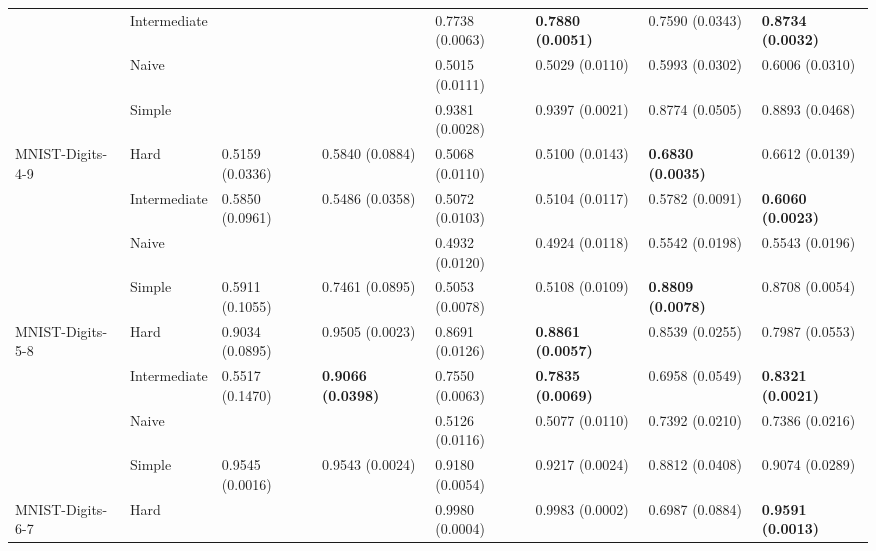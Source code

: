 \begin{tabular}{llllllll}
                 & Intermediate &                  &                           &           0.7738 (0.0063) &  \textbf{0.7880 (0.0051)} &           0.7590 (0.0343) &  \textbf{0.8734 (0.0032)} \\
                 & Naive &                  &                           &           0.5015 (0.0111) &           0.5029 (0.0110) &           0.5993 (0.0302) &           0.6006 (0.0310) \\
                 & Simple &                  &                           &           0.9381 (0.0028) &           0.9397 (0.0021) &           0.8774 (0.0505) &           0.8893 (0.0468) \\
MNIST-Digits-4-9 & Hard &  0.5159 (0.0336) &           0.5840 (0.0884) &           0.5068 (0.0110) &           0.5100 (0.0143) &  \textbf{0.6830 (0.0035)} &           0.6612 (0.0139) \\
                 & Intermediate &  0.5850 (0.0961) &           0.5486 (0.0358) &           0.5072 (0.0103) &           0.5104 (0.0117) &           0.5782 (0.0091) &  \textbf{0.6060 (0.0023)} \\
                 & Naive &                  &                           &           0.4932 (0.0120) &           0.4924 (0.0118) &           0.5542 (0.0198) &           0.5543 (0.0196) \\
                 & Simple &  0.5911 (0.1055) &           0.7461 (0.0895) &           0.5053 (0.0078) &           0.5108 (0.0109) &  \textbf{0.8809 (0.0078)} &           0.8708 (0.0054) \\
MNIST-Digits-5-8 & Hard &  0.9034 (0.0895) &           0.9505 (0.0023) &           0.8691 (0.0126) &  \textbf{0.8861 (0.0057)} &           0.8539 (0.0255) &           0.7987 (0.0553) \\
                 & Intermediate &  0.5517 (0.1470) &  \textbf{0.9066 (0.0398)} &           0.7550 (0.0063) &  \textbf{0.7835 (0.0069)} &           0.6958 (0.0549) &  \textbf{0.8321 (0.0021)} \\
                 & Naive &                  &                           &           0.5126 (0.0116) &           0.5077 (0.0110) &           0.7392 (0.0210) &           0.7386 (0.0216) \\
                 & Simple &  0.9545 (0.0016) &           0.9543 (0.0024) &           0.9180 (0.0054) &           0.9217 (0.0024) &           0.8812 (0.0408) &           0.9074 (0.0289) \\
MNIST-Digits-6-7 & Hard &                  &                           &           0.9980 (0.0004) &           0.9983 (0.0002) &           0.6987 (0.0884) &  \textbf{0.9591 (0.0013)} \\

\end{tabular}

